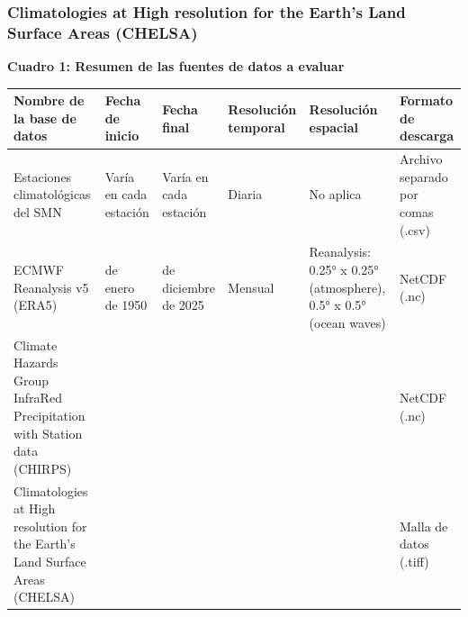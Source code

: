 \documentclass[
  spanish,
  letterpaper,
  DIV=11,
  numbers=noendperiod]{scrartcl}
\newcounter{none} %
\begin{document}
\subsubsection{Climatologies at High resolution for the Earth's Land
Surface Areas
(CHELSA)}\label{climatologies-at-high-resolution-for-the-earths-land-surface-areas-chelsa}

\textbf{Cuadro 1: Resumen de las fuentes de datos a evaluar}

{\def\LTcaptype{none} %
\begin{longtable}[]{@{}
  >{\raggedright\arraybackslash}p{}
  >{\raggedright\arraybackslash}p{}
  >{\raggedright\arraybackslash}p{}
  >{\raggedright\arraybackslash}p{}
  >{\raggedright\arraybackslash}p{}
  >{\raggedright\arraybackslash}p{}@{}}
\toprule\noalign{}
\begin{minipage}[b]{\linewidth}\raggedright
Nombre de la base de datos
\end{minipage} & \begin{minipage}[b]{\linewidth}\raggedright
Fecha de inicio
\end{minipage} & \begin{minipage}[b]{\linewidth}\raggedright
Fecha final
\end{minipage} & \begin{minipage}[b]{\linewidth}\raggedright
Resolución temporal
\end{minipage} & \begin{minipage}[b]{\linewidth}\raggedright
Resolución espacial
\end{minipage} & \begin{minipage}[b]{\linewidth}\raggedright
Formato de descarga
\end{minipage} \\
\midrule\noalign{}
\endhead
\bottomrule\noalign{}
\endlastfoot
Estaciones climatológicas del SMN & Varía en cada estación & Varía en
cada estación & Diaria & No aplica & Archivo separado por comas
(.csv) \\
ECMWF Reanalysis v5 (ERA5) & 1 de enero de 1950 & 31 de diciembre de
2025 & Mensual & Reanalysis: 0.25° x 0.25° (atmosphere), 0.5° x 0.5°
(ocean waves) & NetCDF (.nc) \\
Climate Hazards Group InfraRed Precipitation with Station data (CHIRPS)
& & & & & NetCDF (.nc) \\
Climatologies at High resolution for the Earth's Land Surface Areas
(CHELSA) & & & & & Malla de datos (.tiff) \\
\end{longtable}
}
\end{document}
